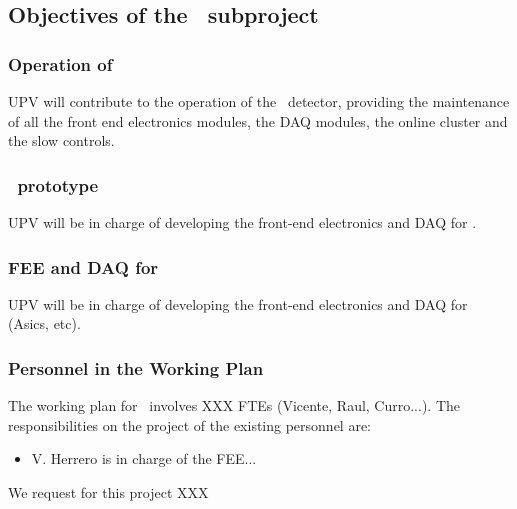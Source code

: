 \subsection{Objectives of the \sUPV\ subproject}
\label{sec.obj.dipc}
\subsubsection*{Operation of \Next}

\indent

UPV will contribute to the operation of the \Next\ detector, providing the maintenance of all the front end electronics modules, the DAQ modules, the online cluster and the slow controls. 


\subsubsection*{\HDEMO\ prototype}

\indent

UPV will be in charge of developing the front-end electronics and DAQ for \HDEMO.
 
\subsubsection*{FEE and DAQ for \NHD}

\indent

UPV will be in charge of developing the front-end electronics and DAQ for \NHD (Asics, etc). 
 



\subsubsection*{Personnel in the Working Plan}
The working plan for \sUPV\ involves XXX FTEs (Vicente, Raul, Curro...). The responsibilities on the project of the existing personnel are:


\begin{itemize}[noitemsep,topsep=0pt,parsep=0pt,partopsep=0pt]
\item V. Herrero is in charge of the FEE... 
\end{itemize}

We request for this project XXX

